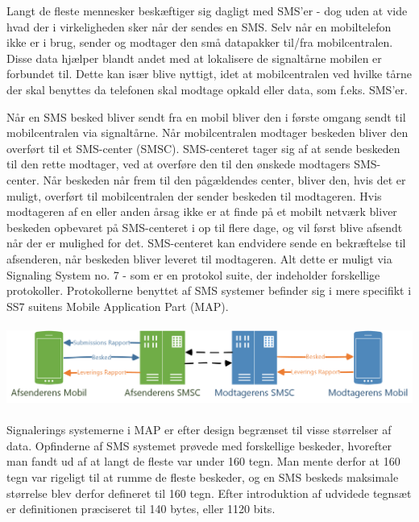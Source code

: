 Langt de fleste mennesker beskæftiger sig dagligt med SMS'er - dog uden at vide hvad der i virkeligheden sker når der sendes en SMS. Selv når en mobiltelefon ikke er i brug, sender og modtager den små datapakker til/fra mobilcentralen. Disse data hjælper blandt andet med at lokalisere de signaltårne mobilen er forbundet til. Dette kan især blive nyttigt, idet at mobilcentralen ved hvilke tårne der skal benyttes da telefonen skal modtage opkald eller data, som f.eks. SMS'er.

Når en SMS besked bliver sendt fra en mobil bliver den i første omgang sendt til mobilcentralen via signaltårne. Når mobilcentralen modtager beskeden bliver den overført til et SMS-center (SMSC). SMS-centeret tager sig af at sende beskeden til den rette modtager, ved at overføre den til den ønskede modtagers SMS-center. Når beskeden når frem til den pågældendes center, bliver den, hvis det er muligt, overført til mobilcentralen der sender beskeden til modtageren. Hvis modtageren af en eller anden årsag ikke er at finde på et mobilt netværk bliver beskeden opbevaret på SMS-centeret i op til flere dage, og vil først blive afsendt når der er mulighed for det. SMS-centeret kan endvidere sende en bekræftelse til afsenderen, når beskeden bliver leveret til modtageren. Alt dette er muligt via Signaling System no. 7 - som er en protokol suite, der indeholder forskellige protokoller. Protokollerne benyttet af SMS systemer befinder sig i mere specifikt i SS7 suitens Mobile Application Part (MAP). \cite{Pro_1} \cite{sms_max1}
\\
\\
\noindent
\includegraphics[width=\linewidth]{Billeder/Mobil.png}
\\
\\
Signalerings systemerne i MAP er efter design begrænset til visse størrelser af data. Opfinderne af SMS systemet prøvede med forskellige beskeder, hvorefter man fandt ud af at langt de fleste var under 160 tegn. Man mente derfor at 160 tegn var rigeligt til at rumme de fleste beskeder, og en SMS beskeds maksimale størrelse blev derfor defineret til 160 tegn. Efter introduktion af udvidede tegnsæt er definitionen præciseret til 140 bytes, eller 1120 bits. \cite{sms_max1} \cite{sms_max2}


